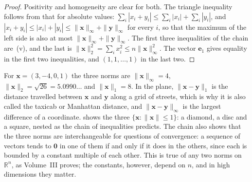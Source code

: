 \begin{proof}
Positivity and homogeneity are clear for both. The triangle inequality follows from that for absolute values: $\sum_i|x_i+y_i|\le\sum_i|x_i|+\sum_i|y_i|$, and $|x_i+y_i|\le|x_i|+|y_i|\le\|\mathbf x\|_\infty+\|\mathbf y\|_\infty$ for every $i$, so that the maximum of the left side is also at most $\|\mathbf x\|_\infty+\|\mathbf y\|_\infty$. The first three inequalities of the chain are \,(v), and the last is $\|\mathbf x\|_2^2=\sum_ix_i^2\le n\|\mathbf x\|_\infty^2$. The vector $\mathbf e_1$ gives equality in the first two inequalities, and $(1,1,\ldots,1)$ in the last two.
\end{proof}

For $\mathbf x=(3,-4,0,1)$ the three norms are $\|\mathbf x\|_\infty=4$, $\|\mathbf x\|_2=\sqrt{26}=5.0990\ldots$ and $\|\mathbf x\|_1=8$. In the plane, $\|\mathbf x-\mathbf y\|_1$ is the distance travelled between $\mathbf x$ and $\mathbf y$ along a grid of streets, which is why it is also called the taxicab or Manhattan distance, and $\|\mathbf x-\mathbf y\|_\infty$ is the largest difference of a coordinate.  shows the three  $\{\mathbf x: \|\mathbf x\|\le1\}$: a diamond, a disc and a square, nested as the chain of inequalities predicts. The chain also shows that the three norms are interchangeable for questions of convergence: a sequence of vectors tends to $\mathbf 0$ in one of them if and only if it does in the others, since each is bounded by a constant multiple of each other. This is true of any two norms on $\mathbb R^n$, as Volume~III proves; the constants, however, depend on $n$, and in high dimensions they matter.

\begin{figure}
\end{figure}

